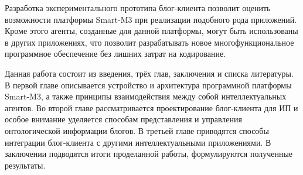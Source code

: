 Разработка экспериментального прототипа блог-клиента позволит оценить возможности платформы Smart-M3 при реализации подобного рода приложений. Кроме этого агенты, созданные для данной платформы, могут быть использованы в других приложениях, что позволит разрабатывать новое многофункциональное программное обеспечение без лишних затрат на кодирование.

Данная работа состоит из введения, трёх глав, заключения и списка литературы. В первой главе описывается устройство и архитектура программной платформы Smart-M3, а также принципы взаимодействия между собой интеллектуальных агентов. Во второй главе рассматривается проектирование блог-клиента для ИП и особое внимание уделяется способам представления и управления онтологической информации блогов. В третьей главе приводятся способы интеграции блог-клиента с другими интеллектуальными приложениями. В заключении подводятся итоги проделанной работы, формулируются полученные результаты.
